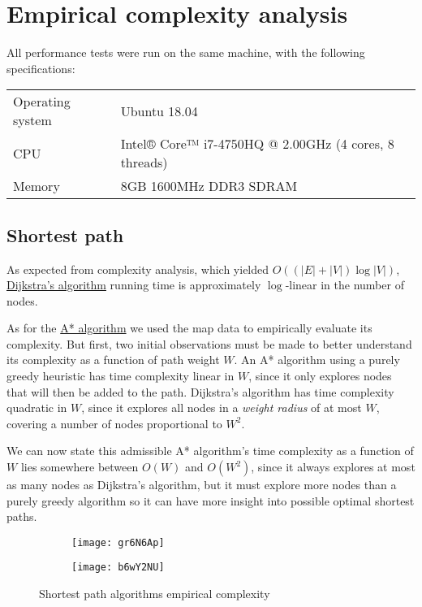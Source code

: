 \chapter{Empirical complexity analysis} \label{empirical}

All performance tests were run on the same machine, with the following specifications:  \vspace{1em} \\
\begin{tabular}{l l}
    Operating system & Ubuntu 18.04 \\
    CPU              & Intel® Core™ i7-4750HQ @ 2.00GHz (4 cores, 8 threads) \\
    Memory           & 8GB 1600MHz DDR3 SDRAM
\end{tabular}

\section{Shortest path}

As expected from complexity analysis, which yielded $O((|E|+|V|) \log |V|)$, \hyperref[alg-dijkstra]{Dijkstra's algorithm} running time is approximately $\log$-linear in the number of nodes.\par
As for the \hyperref[alg-astar]{A* algorithm} we used the map data to empirically evaluate its complexity. But first, two initial observations must be made to better understand its complexity as a function of path weight $W$. An A* algorithm using a purely greedy heuristic has time complexity linear in $W$, since it only explores nodes that will then be added to the path. Dijkstra's algorithm has time complexity quadratic in $W$, since it explores all nodes in a \emph{weight radius} of at most $W$, covering a number of nodes proportional to $W^2$.\par
We can now state this admissible A* algorithm's time complexity as a function of $W$ lies somewhere between $O(W)$ and $O(W^2)$, since it always explores at most as many nodes as Dijkstra's algorithm, but it must explore more nodes than a purely greedy algorithm so it can have more insight into possible optimal shortest paths.

\begin{figure}[H]
    \centering
    \begin{subfigure}{0.49\textwidth}
        \centering
        \texttt{[image: gr6N6Ap]}
    \end{subfigure}
    \begin{subfigure}{0.49\textwidth}
        \centering
        \texttt{[image: b6wY2NU]}
    \end{subfigure}
    \caption{Shortest path algorithms empirical complexity}
\end{figure}


